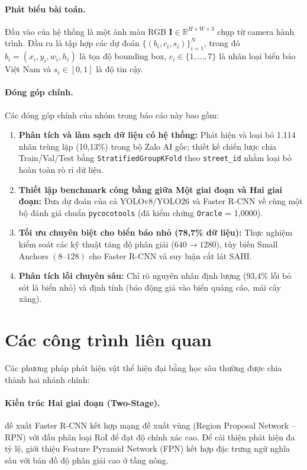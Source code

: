 \documentclass[11pt]{article}
\begin{document}
\paragraph{Phát biểu bài toán.}
Đầu vào của hệ thống là một ảnh màu RGB $\mathbf{I} \in \mathbb{R}^{H \times W \times 3}$ chụp từ camera hành trình. Đầu ra là tập hợp các dự đoán $\{(b_i, c_i, s_i)\}_{i=1}^{N}$, trong đó $b_i = (x_i, y_i, w_i, h_i)$ là tọa độ bounding box, $c_i \in \{1,\dots,7\}$ là nhãn loại biển báo Việt Nam và $s_i \in [0, 1]$ là độ tin cậy.

\paragraph{Đóng góp chính.}
Các đóng góp chính của nhóm trong báo cáo này bao gồm:
\begin{enumerate}
  \item \textbf{Phân tích và làm sạch dữ liệu có hệ thống:} Phát hiện và loại bỏ 1.114 nhãn trùng lặp (10,13\%) trong bộ Zalo AI gốc; thiết kế chiến lược chia Train/Val/Test bằng \texttt{StratifiedGroupKFold} theo \texttt{street\_id} nhằm loại bỏ hoàn toàn rò rỉ dữ liệu.
  \item \textbf{Thiết lập benchmark công bằng giữa Một giai đoạn và Hai giai đoạn:} Đưa dự đoán của cả YOLOv8/YOLO26 và Faster R-CNN về cùng một bộ đánh giá chuẩn \texttt{pycocotools} (đã kiểm chứng \texttt{Oracle} = 1,0000).
  \item \textbf{Tối ưu chuyên biệt cho biển báo nhỏ (78,7\% dữ liệu):} Thực nghiệm kiểm soát các kỹ thuật tăng độ phân giải ($640 \rightarrow 1280$), tùy biến Small Anchors $(8\text{--}128)$ cho Faster R-CNN và suy luận cắt lát SAHI.
  \item \textbf{Phân tích lỗi chuyên sâu:} Chỉ rõ nguyên nhân định lượng (93,4\% lỗi bỏ sót là biển nhỏ) và định tính (báo động giả vào biển quảng cáo, mái cây xăng).
\end{enumerate}

\section{Các công trình liên quan}
\label{sec:related}

Các phương pháp phát hiện vật thể hiện đại bằng học sâu thường được chia thành hai nhánh chính:

\paragraph{Kiến trúc Hai giai đoạn (Two-Stage).}
\citet{ren2015faster} đề xuất Faster R-CNN kết hợp mạng đề xuất vùng (Region Proposal Network -- RPN) với đầu phân loại RoI để đạt độ chính xác cao. Để cải thiện phát hiện đa tỷ lệ, \citet{lin2017fpn} giới thiệu Feature Pyramid Network (FPN) kết hợp đặc trưng ngữ nghĩa sâu với bản đồ độ phân giải cao ở tầng nông.
\end{document}
